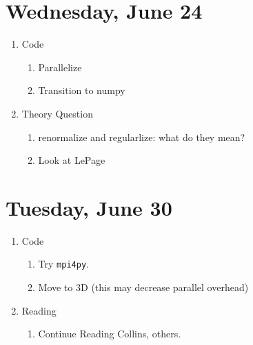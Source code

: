 \documentclass[english]{article}
\begin{document}
 \section{Wednesday, June 24}
    \begin{enumerate}

        \item Code
        \begin{enumerate}
            \item Parallelize
            \item Transition to numpy
        \end{enumerate}
        \item Theory Question
        \begin{enumerate}
            \item renormalize and regularlize: what do they mean?
            \item Look at LePage
        \end{enumerate}

    \end{enumerate}

 \section{Tuesday, June 30}
    \begin{enumerate}
        \item Code
        \begin{enumerate}
            \item Try \texttt{mpi4py}.
            \item Move to 3D (this may decrease parallel overhead)
        \end{enumerate}

        \item Reading
        \begin{enumerate}
            \item Continue Reading Collins, others. 
        \end{enumerate}
    \end{enumerate}

\nocite{*}


\end{document}
